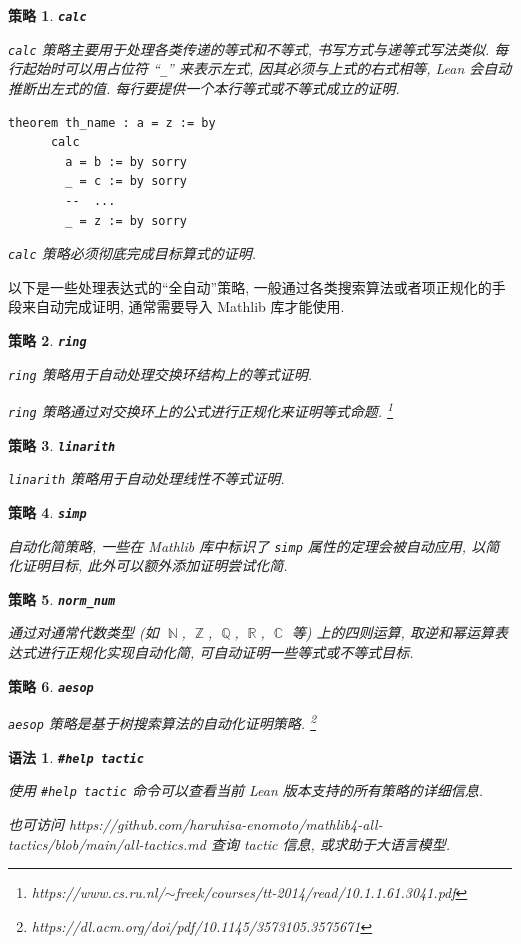 \documentclass[UTF8]{ctexart}
\DeclareMathOperator{\N}{\mathbb{N}}                    %
\DeclareMathOperator{\Z}{\mathbb{Z}}                    %
\DeclareMathOperator{\Q}{\mathbb{Q}}                    %
\DeclareMathOperator{\R}{\mathbb{R}}                    %
\DeclareMathOperator{\C}{\mathbb{C}}                    %
\DeclareMathOperator{\0}{\mathbf{0}}                    %
\newcommand{\<}{\langle}
\renewcommand{\>}{\rangle}                              %
\newenvironment{thm_box}{
    \begin{tcolorbox}[enhanced, colback=thm_blue2, boxrule=0pt, frame hidden,
        borderline west={0.7mm}{0.1mm}{thm_blue1},breakable]
    }
    {\end{tcolorbox}}
\theoremstyle{MyStyle} %
\newtheorem{syntax}[definition]{语法}
\newenvironment{syn}[1]
{
    \begin{thm_box}
        \begin{syntax}
            \textbf{#1}
            \newline
}
{
        \end{syntax}
    \end{thm_box}
}
\newtheorem{mytactic}{策略}
\newenvironment{tactic}[1]
{
    \begin{thm_box}
        \begin{mytactic}
            \textbf{#1}
            \newline
}
{
        \end{mytactic}
    \end{thm_box}
}
\newcommand*{\lean}[1]{\texttt{\color{blue}#1}}
\begin{document}
        \begin{tactic}
            {\lean{calc}}
            \lean{calc} 策略主要用于处理各类传递的等式和不等式, 书写方式与递等式写法类似. 每行起始时可以用占位符 ``\texttt{\_}'' 来表示左式, 因其必须与上式的右式相等, Lean 会自动推断出左式的值. 每行要提供一个本行等式或不等式成立的证明. 
            \begin{lstlisting}[style=lean]
    theorem th_name : a = z := by
      calc
        a = b := by sorry
        _ = c := by sorry
        --  ...
        _ = z := by sorry
            \end{lstlisting}

            \lean{calc} 策略必须彻底完成目标算式的证明. 
        \end{tactic}

        以下是一些处理表达式的``全自动''策略, 一般通过各类搜索算法或者项正规化的手段来自动完成证明, 通常需要导入 Mathlib 库才能使用. 

        \begin{tactic}
            {\lean{ring}}
            \lean{ring} 策略用于自动处理交换环结构上的等式证明. 

            \lean{ring} 策略通过对交换环上的公式进行正规化来证明等式命题. \footnote{https://www.cs.ru.nl/$\sim$freek/courses/tt-2014/read/10.1.1.61.3041.pdf}
        \end{tactic}

        \begin{tactic}
            {\lean{linarith}}
            \lean{linarith} 策略用于自动处理线性不等式证明. 
        \end{tactic}

        \begin{tactic}
            {\lean{simp}}
            自动化简策略, 一些在 Mathlib 库中标识了 \lean{simp} 属性的定理会被自动应用, 以简化证明目标, 此外可以额外添加证明尝试化简. 
        \end{tactic}

        \begin{tactic}
            {\lean{norm\_num}}
            通过对通常代数类型 (如 $\N$, $\Z$, $\Q$, $\R$, $\C$ 等) 上的四则运算, 取逆和幂运算表达式进行正规化实现自动化简, 可自动证明一些等式或不等式目标. 
        \end{tactic}

        \begin{tactic}
            {\lean{aesop}}
            \lean{aesop} 策略是基于树搜索算法的自动化证明策略. \footnote{https://dl.acm.org/doi/pdf/10.1145/3573105.3575671}
        \end{tactic}

        \begin{syn}
            {\lean{\#help tactic}}
            使用 \lean{\#help tactic} 命令可以查看当前 Lean 版本支持的所有策略的详细信息. 

            也可访问 https://github.com/haruhisa-enomoto/mathlib4-all-tactics/blob/main/all-tactics.md 查询 tactic 信息, 或求助于大语言模型. 
        \end{syn}
            
\end{document}
